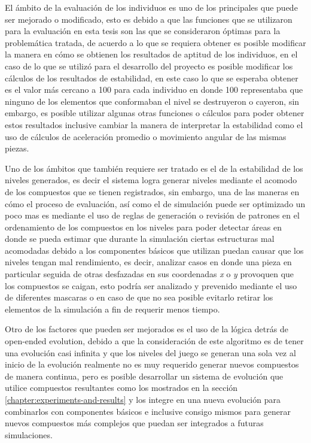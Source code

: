El ámbito de la evaluación de los individuos es uno de los principales que puede
ser mejorado o modificado, esto es debido a que las funciones que se utilizaron
para la evaluación en esta tesis son las que se consideraron óptimas para la
problemática tratada, de acuerdo a lo que se requiera obtener es posible
modificar la manera en cómo se obtienen los resultados de aptitud de los
individuos, en el caso de lo que se utilizó para el desarrollo del proyecto es
posible modificar los cálculos de los resultados de estabilidad, en este caso lo
que se esperaba obtener es el valor más cercano a 100 para cada individuo en
donde 100 representaba que ninguno de los elementos que conformaban el nivel se
destruyeron o cayeron, sin embargo, es posible utilizar algunas otras funciones o
cálculos para poder obtener estos resultados inclusive cambiar la manera de
interpretar la estabilidad como el uso de cálculos de aceleración promedio o
movimiento angular de las mismas piezas.

Uno de los ámbitos que también requiere ser tratado es el de la estabilidad de
los niveles generados, es decir el sistema logra generar niveles mediante el
acomodo de los compuestos que se tienen registrados, sin embargo, una de las
maneras en cómo el proceso de evaluación, así como el de simulación puede ser
optimizado un poco mas es mediante el uso de reglas de generación o revisión de
patrones en el ordenamiento de los compuestos en los niveles para poder detectar
áreas en donde se pueda estimar que durante la simulación ciertas estructuras
mal acomodadas debido a los componentes básicos que utilizan puedan causar que
los niveles tengan mal rendimiento, es decir, analizar casos en donde una pieza
en particular seguida de otras desfazadas en sus coordenadas \textit{x} o
\textit{y} provoquen que los compuestos se caigan, esto podría ser analizado y
prevenido mediante el uso de diferentes mascaras o en caso de que no sea posible
evitarlo retirar los elementos de la simulación a fin de requerir menos tiempo.

Otro de los factores que pueden ser mejorados es el uso de la lógica detrás de
open-ended evolution, debido a que la consideración de este algoritmo es de
tener una evolución casi infinita y que los niveles del juego se generan una
sola vez al inicio de la evolución realmente no es muy requerido generar nuevos
compuestos de manera continua, pero es posible desarrollar un sistema de
evolución que utilice compuestos resultantes como los mostrados en la sección
\ref{chapter:experiments-and-results} y los integre en una nueva evolución para
combinarlos con componentes básicos e inclusive consigo mismos para generar
nuevos compuestos más complejos que puedan ser integrados a futuras
simulaciones.

